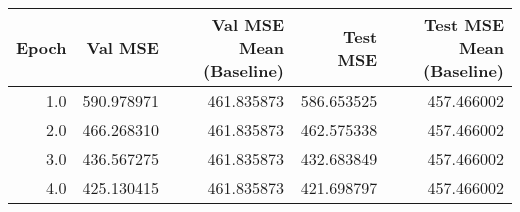 \begin{tabular}{rrrrr}
\toprule
 Epoch &    Val MSE &  Val MSE Mean (Baseline) &   Test MSE &  Test MSE Mean (Baseline) \\
\midrule
   1.0 & 590.978971 &               461.835873 & 586.653525 &                457.466002 \\
   2.0 & 466.268310 &               461.835873 & 462.575338 &                457.466002 \\
   3.0 & 436.567275 &               461.835873 & 432.683849 &                457.466002 \\
   4.0 & 425.130415 &               461.835873 & 421.698797 &                457.466002 \\
\bottomrule
\end{tabular}
